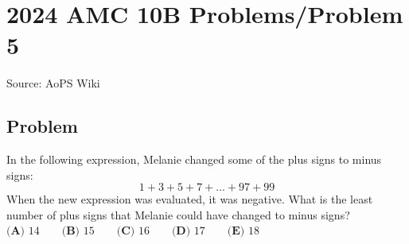 \documentclass[12pt]{article}
\begin{document}
\section*{{2024 AMC 10B Problems/Problem 5}}
Source: AoPS Wiki

\subsection*{Problem}
In the following expression, Melanie changed some of the plus signs to minus signs: \[1+3+5+7+...+97+99\] When the new expression was evaluated, it was negative. What is the least number of plus signs that Melanie could have changed to minus signs? $\textbf{(A) } 14 \qquad\textbf{(B) } 15 \qquad\textbf{(C) } 16 \qquad\textbf{(D) } 17 \qquad\textbf{(E) } 18$
\end{document}
